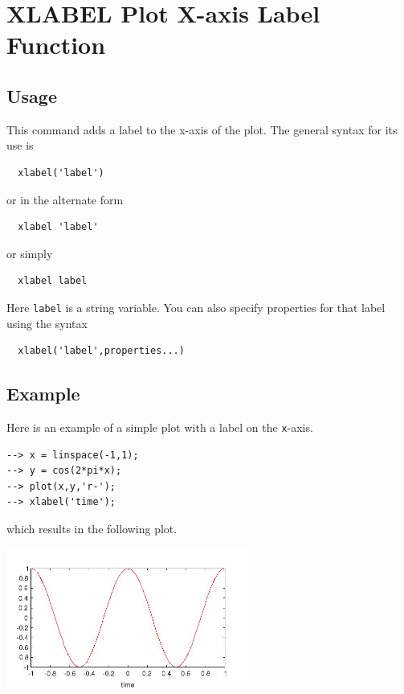 \section{XLABEL Plot X-axis Label Function}

\subsection{Usage}

This command adds a label to the x-axis of the plot.  The general syntax
for its use is
\begin{verbatim}
  xlabel('label')
\end{verbatim}
or in the alternate form
\begin{verbatim}
  xlabel 'label'
\end{verbatim}
or simply
\begin{verbatim}
  xlabel label
\end{verbatim}
Here \verb|label| is a string variable.  You can also specify properties
for that label using the syntax
\begin{verbatim}
  xlabel('label',properties...) 
\end{verbatim}
\subsection{Example}

Here is an example of a simple plot with a label on the \verb|x|-axis.
\begin{verbatim}
--> x = linspace(-1,1);
--> y = cos(2*pi*x);
--> plot(x,y,'r-');
--> xlabel('time');
\end{verbatim}
which results in the following plot.


\centerline{\includegraphics[width=8cm]{xlabel1}}

